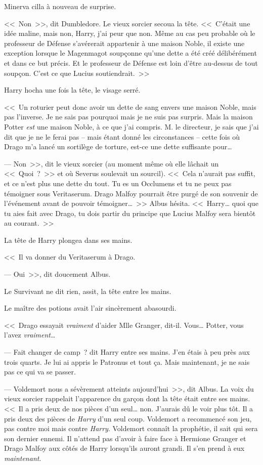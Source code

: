Minerva cilla à nouveau de surprise.

<<~Non~>>, dit Dumbledore. Le vieux sorcier secoua la tête. <<~C'était une idée maline, mais non, Harry, j'ai peur que non. Même au cas peu probable où le professeur de Défense s'avérerait appartenir à une maison Noble, il existe une exception lorsque le Magenmagot soupçonne qu'une dette a été créé délibérément et dans ce but précis. Et le professeur de Défense est loin d'être au-dessus de tout soupçon. C'est ce que Lucius soutiendrait.~>>

Harry hocha une fois la tête, le visage serré.

<<~Un roturier peut donc avoir un dette de sang envers une maison Noble, mais pas l'inverse. Je ne sais pas pourquoi mais je ne suis pas surpris. Mais la maison Potter \emph{est} une maison Noble, à ce que j'ai compris. M. le directeur, je sais que j'ai dit que je ne le ferai pas -- mais étant donné les circonstances -- cette fois où Drago m'a lancé un sortilège de torture, est-ce une dette suffisante pour…

--- Non~>>, dit le vieux sorcier (au moment même où elle lâchait un <<~Quoi~?~>> et où Severus soulevait un sourcil). <<~Cela n'aurait pas suffit, et ce n'est plus une dette du tout. Tu es un Occlumens et tu ne peux pas témoigner sous Veritaserum. Drago Malfoy pourrait être purgé de son souvenir de l'événement avant de pouvoir témoigner…~>> Albus hésita. <<~Harry… quoi que tu aies fait avec Drago, tu dois partir du principe que Lucius Malfoy sera bientôt au courant.~>>

La tête de Harry plongea dans ses mains.

<<~Il va donner du Veritaserum à Drago.

--- Oui~>>, dit doucement Albus.

Le Survivant ne dit rien, assit, la tête entre les mains.

Le maître des potions avait l'air sincèrement abasourdi.

<<~Drago essayait \emph{vraiment} d'aider Mlle Granger, dit-il. Vous… Potter, vous l'avez \emph{vraiment}…

--- Fait changer de camp~? dit Harry entre ses mains. J'en étais à peu près aux trois quarts. Je lui ai appris le Patronus et tout ça. Mais maintenant, je ne sais pas ce qui va se passer.

--- Voldemort nous a sévèrement atteints aujourd'hui~>>, dit Albus. La voix du vieux sorcier rappelait l'apparence du garçon dont la tête était entre ses mains. <<~Il a pris deux de nos pièces d'un seul… non. J'aurais dû le voir plus tôt. Il a pris deux des pièces de \emph{Harry} d'un seul coup. Voldemort a recommencé son jeu, pas contre moi mais contre \emph{Harry}. Voldemort connaît la prophétie, il sait qui sera son dernier ennemi. Il n'attend pas d'avoir à faire face à Hermione Granger et Drago Malfoy aux côtés de Harry lorsqu'ils auront grandi. Il s'en prend à eux \emph{maintenant}.

